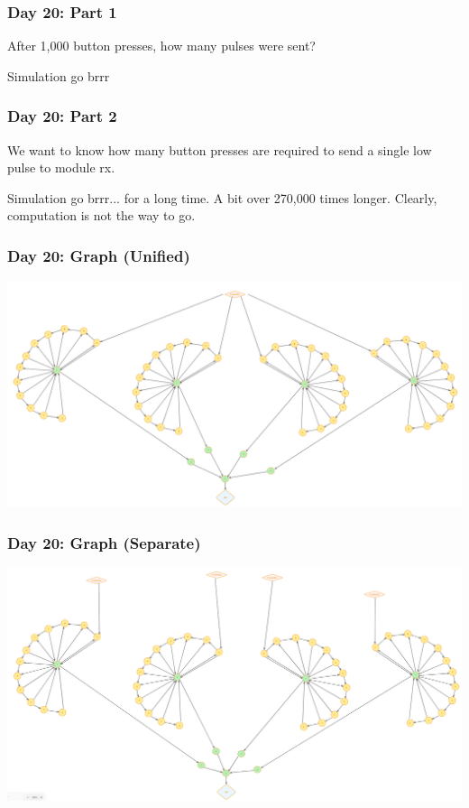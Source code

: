 \begin{frame}
\frametitle{Day 20: Part 1}

After 1,000 button presses, how many pulses were sent?\vfill

Simulation go brrr

\end{frame}

\begin{frame}
\frametitle{Day 20: Part 2}

We want to know how many button presses are required to send a single low pulse to module rx.\vfill

Simulation go brrr... for a long time. A bit over 270,000 times longer. Clearly, computation is not the way to go.\vfill

\end{frame}

\begin{frame}
\frametitle{Day 20: Graph (Unified)}

\includegraphics[width=\textwidth]{Day20GraphUnified}

\end{frame}

\begin{frame}
\frametitle{Day 20: Graph (Separate)}

\includegraphics[width=\textwidth]{Day20GraphSeparate}

\end{frame}

